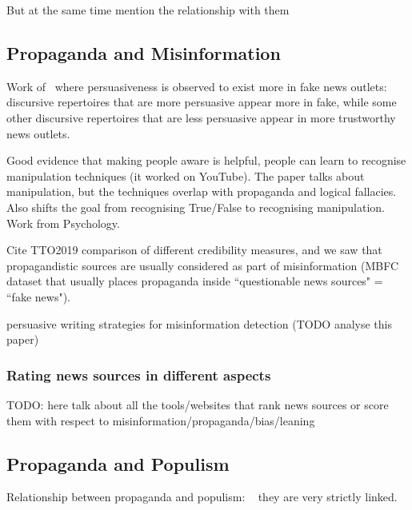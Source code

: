 But at the same time mention the relationship with them

\subsection{Propaganda and Misinformation}
\label{sec:lit_related_misinformation}

Work of~\citet{orrumachine} where persuasiveness is observed to exist more in fake news outlets: discursive repertoires that are more persuasive appear more in fake, while some other discursive repertoires that are less persuasive appear in more trustworthy news outlets.




\cite{roozenbeek2022countering} Good evidence that making people aware is helpful, people can learn to recognise manipulation techniques (it worked on YouTube). The paper talks about manipulation, but the techniques overlap with propaganda and logical fallacies. Also shifts the goal from recognising True/False to recognising manipulation. Work from Psychology.

Cite TTO2019 comparison of different credibility measures, and we saw that propagandistic sources are usually considered as part of misinformation (MBFC dataset that usually places propaganda inside ``questionable news sources" = ``fake news").


\cite{romain2022misinformation} persuasive writing strategies for misinformation detection (TODO analyse this paper)

\subsubsection{Rating news sources in different aspects}

TODO: here talk about all the tools/websites that rank news sources or score them with respect to misinformation/propaganda/bias/leaning

\subsection{Propaganda and Populism}
\label{sec:lit_related_populism}

Relationship between propaganda and populism:
~\cite{oates2021rewired,tumber2021routledge,pasquino2008populism}
they are very strictly linked.

